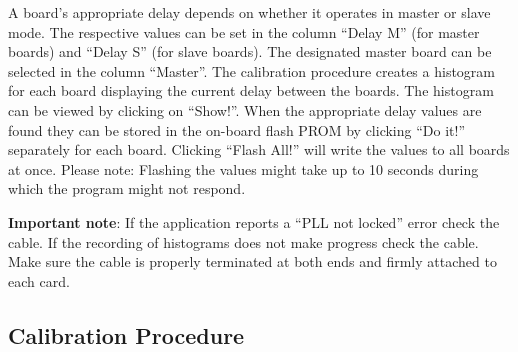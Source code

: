     A board's appropriate delay depends on whether it operates in master or slave mode. The respective values can be set in the column ``Delay M'' (for master boards) and ``Delay S'' (for slave boards). The designated master board can be selected in the column ``Master''. The calibration procedure creates a histogram for each board displaying the current delay between the boards. The histogram can be viewed by clicking on ``Show!''. When the appropriate delay values are found they can be stored in the on-board flash PROM by clicking ``Do it!'' separately for each board. Clicking ``Flash All!'' will write the values to all boards at once. Please note: Flashing the values might take up to 10 seconds during which the program might not respond.\par

\textbf{Important note}: If the application reports a ``PLL not locked'' error check the cable. If the recording of histograms does not make progress check the cable. Make sure the cable is properly terminated at both ends and firmly attached to each card.

    \subsection{Calibration Procedure}
    
